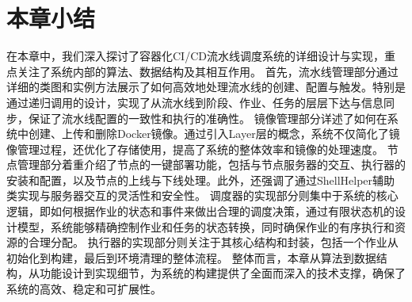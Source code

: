 \section{本章小结}
在本章中，我们深入探讨了容器化CI/CD流水线调度系统的详细设计与实现，重点关注了系统内部的算法、数据结构及其相互作用。
首先，流水线管理部分通过详细的类图和实例方法展示了如何高效地处理流水线的创建、配置与触发。特别是通过递归调用的设计，实现了从流水线到阶段、作业、任务的层层下达与信息同步，保证了流水线配置的一致性和执行的准确性。
镜像管理部分详述了如何在系统中创建、上传和删除Docker镜像。通过引入Layer层的概念，系统不仅简化了镜像管理过程，还优化了存储使用，提高了系统的整体效率和镜像的处理速度。
节点管理部分着重介绍了节点的一键部署功能，包括与节点服务器的交互、执行器的安装和配置，以及节点的上线与下线处理。此外，还强调了通过ShellHelper辅助类实现与服务器交互的灵活性和安全性。
调度器的实现部分则集中于系统的核心逻辑，即如何根据作业的状态和事件来做出合理的调度决策，通过有限状态机的设计模型，系统能够精确控制作业和任务的状态转换，同时确保作业的有序执行和资源的合理分配。
执行器的实现部分则关注于其核心结构和封装，包括一个作业从初始化到构建，最后到环境清理的整体流程。
整体而言，本章从算法到数据结构，从功能设计到实现细节，为系统的构建提供了全面而深入的技术支撑，确保了系统的高效、稳定和可扩展性。